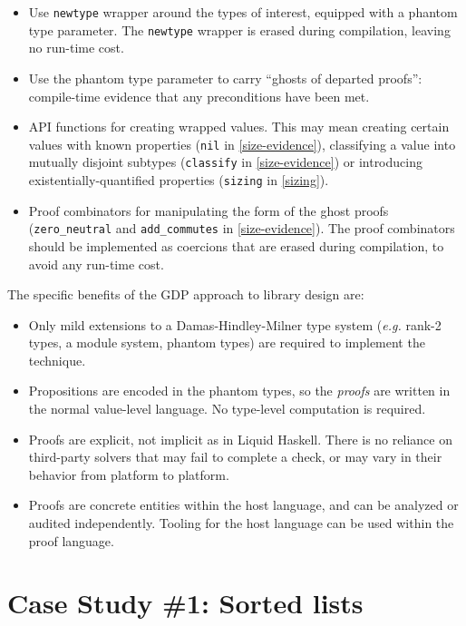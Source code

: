 \documentclass[format=sigplan, review=false, screen=true]{acmart}
\begin{document}
\begin{itemize}
\item Use \texttt{newtype} wrapper around the types of interest, equipped with a phantom
  type parameter. The \texttt{newtype} wrapper is erased during compilation, leaving no run-time cost.
\item Use the phantom type parameter to carry ``ghosts of departed proofs'': compile-time evidence
  that any preconditions have been met.
\item API functions for creating wrapped values. This may mean creating certain values with
  known properties (\texttt{nil} in \cref{size-evidence}), classifying a value into
  mutually disjoint subtypes (\texttt{classify} in \cref{size-evidence})
  or introducing existentially-quantified properties (\texttt{sizing} in \cref{sizing}).
\item Proof combinators for manipulating the form of the ghost proofs (\texttt{zero\_neutral}
  and \texttt{add\_commutes} in \cref{size-evidence}). The proof combinators should be
  implemented as coercions that are erased during compilation, to avoid any run-time cost.
\end{itemize}

The specific benefits of the GDP approach to library design are:
\begin{itemize}
\item Only mild extensions to a Damas-Hindley-Milner type system
  ({\it e.g.} rank-2 types, a module system, phantom types) are required to
  implement the technique.
\item Propositions are encoded in the phantom types, so the
  \emph{proofs} are written in the normal value-level language.
  No type-level computation is required.
\item Proofs are explicit, not implicit as in Liquid Haskell. There is
  no reliance on third-party solvers that may fail to complete a check,
  or may vary in their behavior from platform to platform.
\item Proofs are concrete entities within the host language, and can
  be analyzed or audited independently. Tooling for the host language
  can be used within the proof language.
\end{itemize}

\section{Case Study \#1: Sorted lists}
\end{document}
